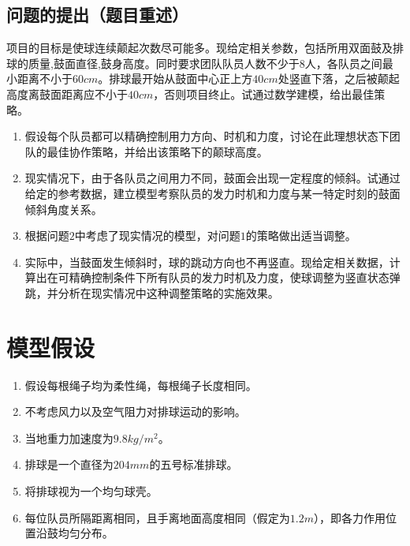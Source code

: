 \documentclass{cumcm}
\begin{document}
\subsection{问题的提出（题目重述）}
项目的目标是使球连续颠起次数尽可能多。现给定相关参数，包括所用双面鼓及排球的质量,鼓面直径,鼓身高度。同时要求团队队员人数不少于$8$人，各队员之间最小距离不小于$60cm$。排球最开始从鼓面中心正上方$40cm$处竖直下落，之后被颠起高度离鼓面距离应不小于$40cm$，否则项目终止。试通过数学建模，给出最佳策略。
\begin{enumerate}[(1)]
\item 假设每个队员都可以精确控制用力方向、时机和力度，讨论在此理想状态下团队的最佳协作策略，并给出该策略下的颠球高度。
\item 现实情况下，由于各队员之间用力不同，鼓面会出现一定程度的倾斜。试通过给定的参考数据，建立模型考察队员的发力时机和力度与某一特定时刻的鼓面倾斜角度关系。
\item 根据问题$2$中考虑了现实情况的模型，对问题$1$的策略做出适当调整。
\item 实际中，当鼓面发生倾斜时，球的跳动方向也不再竖直。现给定相关数据，计算出在可精确控制条件下所有队员的发力时机及力度，使球调整为竖直状态弹跳，并分析在现实情况中这种调整策略的实施效果。
\end{enumerate}

\section{模型假设}
\begin{enumerate}
\item 假设每根绳子均为柔性绳，每根绳子长度相同。
\item 不考虑风力以及空气阻力对排球运动的影响。
\item 当地重力加速度为$9.8kg/m^2$。
\item 排球是一个直径为$204mm$的五号标准排球。
\item 将排球视为一个均匀球壳。
\item 每位队员所隔距离相同，且手离地面高度相同（假定为$1.2m$），即各力作用位置沿鼓均匀分布。
\end{enumerate}
\end{document}
